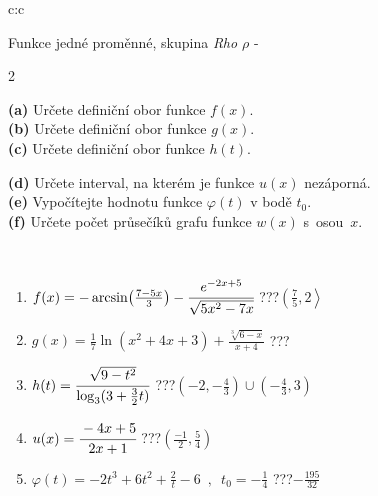 \documentclass[10pt]{report}
\begin{document}
\newpage
\thispagestyle{empty}
\begin{tabular}{c:c}
\begin{minipage}[c][104.5mm][t]{0.5\linewidth}
\begin{center}
\vspace{7mm}
{\huge Funkce jedné proměnné, skupina \textit{Rho $\rho$} -}\\[5mm]
\begin{minipage}{0.95\linewidth}
\begin{center}
{\small \begin{multicols}{2} \raggedright
\textbf{(a)} Určete definiční obor funkce \(f(x)\). \\[1mm]
\textbf{(b)} Určete definiční obor funkce \(g(x)\). \\[1mm]
\textbf{(c)} Určete definiční obor funkce \(h(t)\). \par \columnbreak
\textbf{(d)} Určete interval, na kterém je funkce \(u(x)\) nezáporná. \\[1mm]
\textbf{(e)} Vypočítejte hodnotu funkce \(\varphi(t)\) v bodě \(t_0\). \\[1mm]
\textbf{(f)} Určete počet průsečíků grafu funkce \(w(x)\) s~osou~\(x\). \\[1mm]
\end{multicols}
}
\end{center}
\end{minipage}
\\[4mm]
\begin{minipage}{0.79\linewidth}
\begin{center}
\begin{varwidth}{\linewidth}
\begin{enumerate}
\small
\item $f(x) = -\arcsin\!\left( \frac{7-5x}{3} \right) - \cfrac{e^{-2x+5}}{\sqrt{5x^2-7x}}$\quad \dotfill\; ???\;\dotfill \quad $\left(\frac{7}{5} , 2\right\rangle$
\item $g(x) = \frac{1}{7} \ln{\!(x^2+4x+3)}+\frac{\sqrt[3]{6-x}}{x+4}$\quad \dotfill\; ???\;\dotfill {}
\item $h(t) = \cfrac{\sqrt{9-t^2}}{\log_3(3+\frac{3}{2}t)}$\quad \dotfill\; ???\;\dotfill \quad $\left(-2 , -\frac{4}{3}\right)\cup\left(-\frac{4}{3} , 3\right)$
\item $u(x) = \cfrac{-4x+5}{2x+1}$\quad \dotfill\; ???\;\dotfill \quad $\left(\frac{-1}{2} , \frac{5}{4}\right)$
\item $\varphi(t) = -2t^3+6t^2+\frac{2}{t}-6 \enspace , \enspace t_0=-\frac{1}{4}$\quad \dotfill\; ???\;\dotfill \quad $-\frac{195}{32}$

\end{enumerate}
\end{varwidth}
\end{center}
\end{minipage}
\end{center}
\end{minipage}
\end{tabular}
\end{document}
